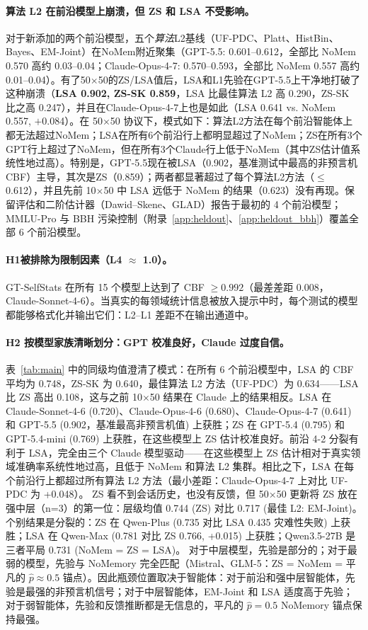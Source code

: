 \documentclass[11pt,a4paper,fontset=fandol]{ctexart}
\begin{document}
\paragraph{算法 L2 在前沿模型上崩溃，但 ZS 和 LSA 不受影响。} 对于新添加的两个前沿模型，五个\emph{算法}L2基线（UF-PDC、Platt、HistBin、Bayes、EM-Joint）在NoMem附近聚集（GPT-5.5: 0.601--0.612，全部比 NoMem 0.570 高约 0.03--0.04；Claude-Opus-4-7: 0.570--0.593，全部比 NoMem 0.557 高约 0.01--0.04）。有了50$\times$50的ZS/LSA值后，LSA和L1先验在GPT-5.5上干净地打破了这种崩溃（\textbf{LSA 0.902, ZS-SK 0.859}，LSA 比最佳算法 L2 高 0.290，ZS-SK 比之高 0.247），并且在Claude-Opus-4-7上也是如此（LSA 0.641 vs. NoMem 0.557, $+$0.084）。在 50$\times$50 协议下，模式如下：算法L2方法在每个前沿智能体上都无法超过NoMem；LSA在所有6个前沿行上都明显超过了NoMem；ZS在所有3个GPT行上超过了NoMem，但在所有3个Claude行上低于NoMem（其中ZS估计值系统性地过高）。特别是，GPT-5.5现在被LSA（0.902，基准测试中最高的非预言机CBF）主导，其次是ZS（0.859）；两者都显著超过了每个算法L2方法（$\le$0.612），并且先前 10$\times$50 中 LSA 远低于 NoMem 的结果（0.623）没有再现。保留评估和二阶估计器（Dawid--Skene、GLAD）报告于最初的 4 个前沿模型；MMLU-Pro 与 BBH 污染控制（附录~\ref{app:heldout}、\ref{app:heldout_bbh}）覆盖全部 6 个前沿模型。

\paragraph{H1被排除为限制因素（L4 $\approx$ 1.0）。}
GT-SelfStats 在所有 15 个模型上达到了 CBF $\geq 0.992$（最差差距 0.008，Claude-Sonnet-4-6）。当真实的每领域统计信息被放入提示中时，每个测试的模型都能够格式化并输出它们：L2--L1 差距不在输出通道中。

\paragraph{H2 按模型家族清晰划分：GPT 校准良好，Claude 过度自信。} 表~\ref{tab:main} 中的同级均值澄清了模式：在所有 6 个前沿模型中，LSA 的 CBF 平均为 0.748，ZS-SK 为 0.640，最佳算法 L2 方法（UF-PDC）为 0.634——LSA 比 ZS 高出 0.108，这与之前 10$\times$50 结果在 Claude 上的结果相反。LSA 在 Claude-Sonnet-4-6 (0.720)、Claude-Opus-4-6 (0.680)、Claude-Opus-4-7 (0.641) 和 GPT-5.5 (0.902，基准最高非预言机值) 上获胜；ZS 在 GPT-5.4 (0.795) 和 GPT-5.4-mini (0.769) 上获胜，在这些模型上 ZS 估计校准良好。前沿 4-2 分裂有利于 LSA，完全由三个 Claude 模型驱动——在这些模型上 ZS 估计相对于真实领域准确率系统性地过高，且低于 NoMem 和算法 L2 集群。相比之下，LSA 在每个前沿行上都超过所有算法 L2 方法（最小差距：Claude-Opus-4-7 上对比 UF-PDC 为 +0.048）。 ZS 看不到会话历史，也没有反馈，但 50$\times$50 更新将 ZS 放在强中层（n=3）的第一位：层级均值 0.744 (ZS) 对比 0.717 (最佳 L2: EM-Joint)。个别结果是分裂的：ZS 在 Qwen-Plus (0.735 对比 LSA 0.435 灾难性失败) 上获胜；LSA 在 Qwen-Max (0.781 对比 ZS 0.766, +0.015) 上获胜；Qwen3.5-27B 是三者平局 0.731 (NoMem = ZS = LSA)。 对于中层模型，先验是部分的；对于最弱的模型，先验与 NoMemory 完全匹配（Mistral、GLM-5：ZS = NoMem = 平凡的 $\hat p \approx 0.5$ 锚点）。因此瓶颈位置取决于智能体：对于前沿和强中层智能体，先验是最强的非预言机信号；对于中层智能体，EM-Joint 和 LSA 适度高于先验；对于弱智能体，先验和反馈推断都是无信息的，平凡的 $\hat{p}=0.5$ NoMemory 锚点保持最强。
\end{document}
